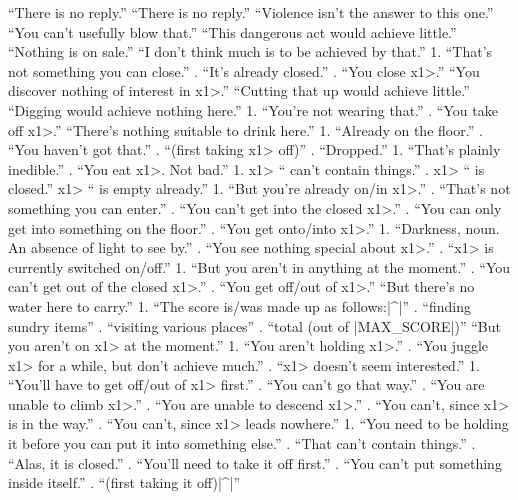 {{{  ``There is no reply.''
   ``There is no reply.''
  ``Violence isn't the answer to this one.''
   ``You can't usefully blow that.''
   ``This dangerous act would achieve little.''
   ``Nothing is on sale.''
  ``I don't think much is to be achieved by that.''
  1. ``That's not something you can close.''
. ``It's already closed.''
. ``You close \<x1>.''
 ``You discover nothing of interest in \<x1>.''
   ``Cutting that up would achieve little.''
   ``Digging would achieve nothing here.''
 1. ``You're not wearing that.''
. ``You take off \<x1>.''
  ``There's nothing suitable to drink here.''
   1. ``Already on the floor.''
. ``You haven't got that.''
. ``(first taking \<x1> off)''
. ``Dropped.''
   1. ``That's plainly inedible.''
. ``You eat \<x1>. Not bad.''
  1. \<x1> `` can't contain things.''
. \<x1> `` is closed.''
\N   \<x1> `` is empty already.''
  1. ``But you're already on/in \<x1>.''
. ``That's not something you can enter.''
. ``You can't get into the closed \<x1>.''
. ``You can only get into something on the floor.''
. ``You get onto/into \<x1>.''
 1. ``Darkness, noun. An absence of light to see by.''
. ``You see nothing special about \<x1>.''
. ``\<x1> is currently switched on/off.''
   1. ``But you aren't in anything at the moment.''
. ``You can't get out of the closed \<x1>.''
. ``You get off/out of \<x1>.''
   ``But there's no water here to carry.''
 1. ``The score is/was made up as follows:|^|''
. ``finding sundry items''
. ``visiting various places''
. ``total (out of |MAX_SCORE|)''
  ``But you aren't on \<x1> at the moment.''
   1. ``You aren't holding \<x1>.''
. ``You juggle \<x1> for a while, but don't achieve much.''
. ``\<x1> doesn't seem interested.''
  1. ``You'll have to get off/out of \<x1> first.''
. ``You can't go that way.''
. ``You are unable to climb \<x1>.''
. ``You are unable to descend \<x1>.''
. ``You can't, since \<x1> is in the way.''
. ``You can't, since \<x1> leads nowhere.''
  1. ``You need to be holding it before you
can put it into something else.''
. ``That can't contain things.''
. ``Alas, it is closed.''
. ``You'll need to take it off first.''
. ``You can't put something inside itself.''
. ``(first taking it off)|^|''
}}}
